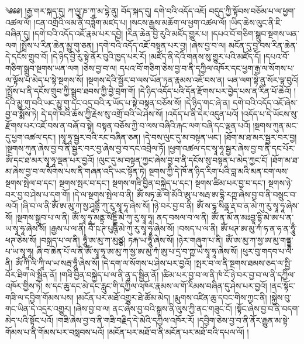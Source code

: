 \setcounter{footnote}{0} 
༄༅༅། །རྒྱ་གར་སྐད་དུ། ཀ་ལྱཱ་ཎ་ཀཱ་མ་དྷེ་ནུ། བོད་སྐད་དུ། དགེ་བའི་འདོད་འཇོ། བདུད་ཀྱི་སྟོབས་བཅོམ་པ་ལ་ཕྱག་འཚལ་ལོ། །ངན་འགྲོའི་ལམ་ནི་བཟློག་མཛད་པ། །སངས་རྒྱས་མཆོག་ལ་ཕྱག་འཚལ་ལོ། །ཡིད་ཆེས་ལུང་ནི་ཇི་བཞིན་དུ། །དགེ་བའི་འདོད་འཇོ་རྣམ་པར་དབྱེ། །རིན་ཆེན་བྱི་རུའི་མཛོད་གྱུར་པ། །དཔའ་བོ་གཅིག་སྒྲུབ་སྔགས་ཡན་ལག །སྤྲོས་པ་རིན་ཆེན་མྱུ་གུ་ཅན། །དགེ་བའི་འདོད་འཇོ་བསྟན་པར་བྱ། །ཞེས་བྱ་བ་ལ། མངོན་དུ་བྱ་བས་རིན་ཆེན་དེ་དངོས་གྲུབ་བོ། །དེ་ཉིད་བྱི་རུ་སྟེ་ནོར་བུའི་ཁྱད་པར་རོ། །མཛོད་ནི་དེའི་གནས་སུ་གྱུར་པའི་མཛོད་དོ། །དཔའ་བོ་གཅིག་སྒྲུབ་སྔགས་ཡན་ལག །ཅེས་བྱ་བ་ལ། དཔའ་བོ་གཅིག་ཅེས་བྱ་བ་ནི་དཀྱིལ་འཁོར་དང་ཕྱག་རྒྱ་ལ་སོགས་པ་ལ་ལྟོས་པ་མེད་པ་སྟེ་སྔགས་སོ། །སྔགས་དེའི་སྦྱོར་བ་ལས་ཡོན་ཏན་རྣམས་འཇོ་བས་ན། ཡན་ལག་སྟེ་ནུ་སོར་ལྟ་བུའོ། །སྤྲོས་པ་ནི་དངོས་གྲུབ་ཀྱི་སྒྲུབ་ཐབས་ཀྱི་བྱེ་བྲག་གོ། །དེ་ཉིད་འདོད་པའི་དོན་རྫོགས་པར་བྱེད་པས་ན་རིན་པོ་ཆེའོ། །དེའི་མྱུ་གུ་བའི་ཡང་མྱུ་གུ་དང་འདྲ་བའི་རྭ་ཡོད་པ་སྟེ་བསྟན་བཅོས་སོ། །དེ་ཉིད་གང་ཞེ་ན། དགེ་བའི་འདོད་འཇོ་ཞེས་བྱ་བ་སྨོས་ཏེ། དེ་དགེ་བའི་ཆོས་ཀྱི་རྗེས་སུ་འགྲོ་བའི་ཡེ་ཤེས་སོ། །འདོད་པ་ནི་དེར་འདུན་པའོ། །འདོད་པ་དེ་ཡོངས་སུ་རྫོགས་པར་འཇོ་བས་ན་བཞོ་བ་སྟེ། བསྟན་བཅོས་ཀྱི་བ་ལས་བཞིའི་རྐང་ལག་བཞི་དང་ལྡན་པའོ། །སྔགས་ཀུན་མང་དུ་ཕྱག་འཚལ་དང་། །སྭཱ་ཧཱ་སྦྱར་བའི་རང་བཞིན་ཅན། །དེ་བས་ལུང་དུ་མ་བསྟན་ཡང་། །ཐོག་མ་ཐ་མར་སྦྱར་བར་བྱ། །སྔགས་ཀུན་ཞེས་བྱ་བ་ནི་སྦྱར་བར་བྱ་ཞེས་བྱ་བ་དང་འབྲེལ་ཏོ། །ཕྱག་འཚལ་དང་སྭཱ་ཧཱ་སྦྱར་ཞེས་བྱ་བ་ནི་དང་པོར་ཨོཾ་དང་ཐ་མར་སྭཱ་ཧཱ་ལྡན་པར་བྱའོ། །ལུང་དུ་མ་བསྟན་ཀྱང་ཞེས་བྱ་བ་ནི་དངོས་སུ་བསྟན་པ་མེད་ཀྱང་ངོ། །ཐོག་མ་ཐ་མ་ཞེས་བྱ་བ་ལ་སོགས་པས་ནི་གཞན་འདི་ཡང་སྟོན་ཏེ། སྔགས་ཀྱི་དེ་ཁོ་ན་ཉིད་རིག་པའི་བླ་མའི་མན་ངག་ལས་སྔགས་སྤེལ་བ་དང་། སྔགས་སྤར་བ་དང་། སྔགས་གཟི་བྱིན་བསྐྱེད་པ་དང་། སྔགས་ཚིམ་པར་བྱ་བ་དང་། སྔགས་ཉེ་བར་བྱ་བ་ཤེས་པ་དག་གོ། །དེ་ལ་སྔགས་སྤེལ་བ་ནི། ཨོཾ་སཏྭ་ཆེ་གེ་མོའི་ཨུ་པ་སརྦ་ཨ་དྷི་རཀྵ་ཞེས་བྱ་བ་ནི་བསྲུང་བ་ལའོ། །ཞི་བ་ལ་ནི་ཨོཾ་ཨ་མུ་ཀ་སྱ་ཤཱནྟིཾ་ཀུ་རུ་སྭཱ་ཧཱ་ཞེས་སོ། །ཉེ་བར་བྱ་བ་ནི། ཨོཾ་ས་དྷ་སིནྣ་རྡ་བ་ན་མེ་ཀུ་རུ་སྭཱ་ཧཱ་ཞེས་སོ། །སྔགས་སྒྲུབ་པ་ལ་ནི། ཨོཾ་སྭཱ་ཧཱ་མནྟྲ་སིདྡྷིཾ་མེ་ཀུ་རུ་སྭཱ་ཧཱ། ནད་བསལ་བ་ལ་ནི། ཨོཾ་ན་མོ་ན་མཿབྱཱ་དྷི་མེ་ཨ་པ་ན་ཡ་སྭཱ་ཧཱ་ཞེས་སོ། །རྒྱས་པ་ལ་ནི། བཽ་ཥ་ཊ་པུཥྚིཾ་མེ་ཀུ་རུ་སྭཱ་ཧཱ་ཞེས་སོ། །བསད་པ་ལ་ནི། ཨོཾ་ཕཊ་ཨ་མུ་ཀཾ་ཧ་ན་ཧ་ན་ཧཱུྃ་ཕཊ་ཅེས་སོ། །བསྐྲད་པ་ལ་ནི། ཧཱུྃ་ཨ་མུ་ཀ་མུཙྩ། ཏརྐ་ཡ་ཧཱུྃ་ཞེས་སོ། །ཉེར་གཞུག་པ་ནི། ཨོཾ་ཨ་མུ་ཀ་སྱ་ཨ་མུ་གནྡྷ་པ་ཡ་སྭཱ་ཧཱ། ཞི་བ་ཆེན་པོ་ལ་ནི་ཨོཾ་སྭཱ་ཧཱ་ཨ་མུ་ཀ་སྱ་ཨ་མུ་ཀཾ་ཨུ་པ་དྲ་བ་ཀྵ་ཡེ་སྭཱ་ཧཱ་ཞེས་སོ། །ཕུར་བུ་གདབ་པ་ལ་ནི། ཨོཾ་ཀཱི་ལི་ཀཱི་ལ་ཡ་སརྦ་ཧཱུྃ་ཞེས་སོ། །དེ་དག་ལ་སོགས་པ་ཤེས་པར་བྱའོ། །སྤར་བ་ལ་ནི་སྔགས་ཐམས་ཅད་ལ་སྤྱི་བོར་ཐིག་ལེ་སྦྱིན་ནོ། །གཟི་བྱིན་བསྐྱེད་པ་ལ་ནི་ནཱ་ད་སྦྱིན་ནོ། །ཚིམ་པར་བྱ་བ་ལ་ནི་ཁཾ་ངོ་ཉེ་བར་བྱ་བ་ལ་ནི་དཀྱིལ་འཁོར་གྱིས་ཏེ། ས་དང་ཆུ་དང་མེ་དང་རླུང་གི་དཀྱིལ་འཁོར་རྣམས་ལ་གོ་རིམས་བཞིན་དུ་ཤེས་པར་བྱའོ། །ནང་སྟོང་གཟི་ལ་དབྱིག་གོམས་པས། །མངོན་པར་མཐོ་འགྱུར་ཐེ་ཚོམ་མེད། །རྨུགས་འཛིན་ཆུ་དབང་གིས་ཀྱང་ནི། །སྐྱེས་བུ་གང་ཡིན་དེ་འདྲར་འགྱུར། །ཞེས་བྱ་བ་ལ། ནང་ཞེས་བྱ་བའི་སྒྲས་ནི་ལུས་ཀྱི་ནང་གཟུང་ངོ། །སྟོང་ཞེས་བྱ་བ་ནི་བདག་མེད་པའི་སྟོང་པའོ། །གཟི་ཞེས་བྱ་བ་ནི་གཟི་བརྗིད་དེ་མེའི་དཀྱིལ་འཁོར་རོ། །དབྱིག་ཅེས་བྱ་བ་ནི་ནོར་རྒྱུན་མ་སྟེ་གོམས་པ་ནི་གོམས་པར་བསླབས་པའོ། །མངོན་པར་མཐོ་བ་ནི་མངོན་པར་མཐོ་བའི་དཔལ་ལོ། །
